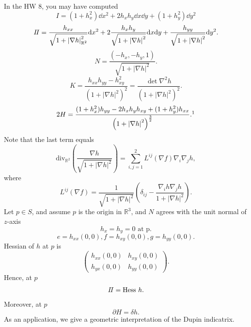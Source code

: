 In the HW 8, you may have computed 
\[
    I=\left(1+h_x^2\right)\dd x^2+2h_x h_y\dd x\dd y+(1+h_y^2)\dd y^2
\]
\[
    I\!I =\frac{h_{xx}}{\sqrt{1+\left|\nabla h\right|_{\mathbb{R}^2}^2}}
    \dd x^2 +2 \frac{h_{x}h_y}{\sqrt{1+\left|\nabla h
    \right|^2}}\dd x\dd y+\frac{h_{yy}}{\sqrt{1+\left|
        \nabla h\right|^2}}\dd y^2.
\]
\[
N=\frac{\left(-h_x,-h_y,1\right)}{\sqrt{1+\left|
    \nabla h\right|^2}}.    
\]
\[
    K=\frac{h_{xx}h_{yy}-h_{xy}^2}{\left(1+\left|
        \nabla h\right|^2\right)^2}=\frac{\det \nabla^2h}{\left(1+\left|
            \nabla h\right|^2\right)^2}.
\]
\[
    2H=\frac{(1+h_x^2)h_{yy}-2 h_x h_y h_{xy}+(1+h_y^2)h_{xx}}{
        \left(1+\left|
            \nabla h\right|^2\right)^{\frac{3}{2}}
    }    .
    \footnotemark
\]
Note that the last term equals \[
    \mathrm{div}_{\mathbb{R}^2}\left(\frac{\nabla h}{
        \sqrt{1+\left|
            \nabla h\right|^2}
    }\right)
    =
    \sum_{i,j=1}^2 L^{ij}\left(\nabla f\right)\nabla_i\nabla_j h,
\]
where \[
    L^{ij}\left(\nabla f\right)=\frac{1}{\sqrt{1+\left|
        \nabla h\right|^2}}\left(\delta_{ij}-
        \frac{\nabla_i h\nabla_j h}{1+\left|
            \nabla h\right|^2}\right)    .
\]
Let \(p\in S\), and assume \(p\) is the origin in \(\mathbb{R}^3\),
 and \(N\) agrees with the unit normal of \(z\)-axis
 \[
    h_x=h_y=0\text{ at p}.   
 \]
 \[
    e=h_{xx}(0,0), f=h_{xy}(0,0), g=h_{yy}(0,0).   
 \]
 Hessian of \(h\) at \(p\) is 
 \[
    \begin{pmatrix}
        h_{xx}(0,0)& h_{xy}(0,0)\\
        h_{yx}(0,0)&h_{yy}(0,0)
    \end{pmatrix} .  
 \]
 Hence, at \(p\)
 \[
    I\!I=\mathrm{Hess}~h.   
 \]
 Moreover, at \(p\)
 \[
    \partial H=\delta h.
 \]
 As an application, we give a geometric interpretation of the Dupin
 indicatrix.


